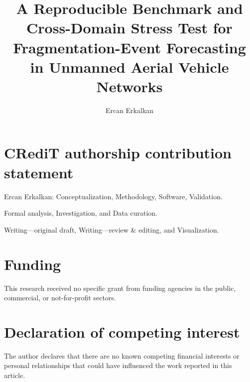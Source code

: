 \documentclass[preprint,12pt]{elsarticle}
\begin{document}
\begin{frontmatter}

\title{A Reproducible Benchmark and Cross-Domain Stress Test for\\Fragmentation-Event Forecasting in Unmanned Aerial Vehicle Networks}

\author[Ercan]{Ercan Erkalkan}


\end{frontmatter}

\section*{CRediT authorship contribution statement}
Ercan Erkalkan: Conceptualization, Methodology, Software, Validation.\par
Formal analysis, Investigation, and Data curation.\par
Writing---original draft, Writing---review \& editing, and Visualization.

\section*{Funding}
This research received no specific grant from funding agencies in the public, commercial, or not-for-profit sectors.

\section*{Declaration of competing interest}
The author declares that there are no known competing financial interests or personal relationships that could have influenced the work reported in this article.
\end{document}
